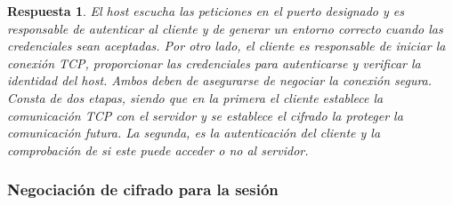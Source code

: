 \documentclass[
  a4paper,
  spanish,
  12pt,
]{scrartcl}
\theoremstyle{ejercicio-style}
\theoremstyle{remark-style}
\newtheorem*{sol}{Respuesta}
\theoremstyle{teorema-style}
\begin{document}
\begin{sol}
  El host escucha las peticiones en el puerto designado y es responsable de autenticar al cliente y de generar un entorno correcto cuando las credenciales sean aceptadas. Por otro lado, el cliente es responsable de iniciar la conexión TCP, proporcionar las credenciales para autenticarse y verificar la identidad del host. Ambos deben de asegurarse de negociar la conexión segura.\\

  Consta de dos etapas, siendo que en la primera el cliente establece la comunicación TCP con el servidor y se establece el cifrado la proteger la comunicación futura. La segunda, es la autenticación del cliente y la comprobación de si este puede acceder o no al servidor.

  \subsubsection*{Negociación de cifrado para la sesión}



\end{sol}
\end{document}
